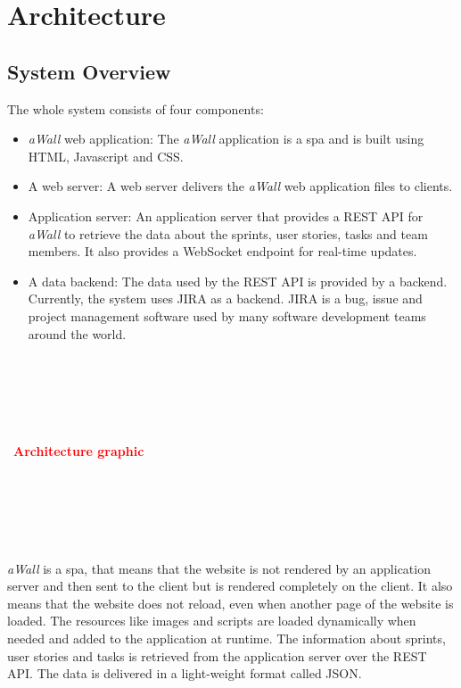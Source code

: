 \documentclass{sigchi}
\newcommand\todo[1]{\\~\\~\\~\\~\\~\textbf{\huge{\textcolor{red}{#1}}}\\~\\~\\~\\~\\~}
\begin{document}
\section{Architecture}

\subsection{System Overview}

The whole system consists of four components:
\begin{itemize}
	\item \textit{aWall} web application: The \textit{aWall} application is a \gls{spa} and is built using HTML, Javascript and CSS.
	\item A web server: A web server delivers the \textit{aWall} web application files to clients.
	\item Application server: An application server that provides a REST API for \textit{aWall} to retrieve the data about the sprints, user stories, tasks and team members.
	It also provides a WebSocket endpoint for real-time updates.
	\item A data backend: The data used by the REST API is provided by a backend. 
	Currently, the system uses JIRA \cite{jira} as a backend. JIRA is a bug, issue and project management software used by many software development teams around the world.
\end{itemize}

\todo{Architecture graphic}

\textit{aWall} is a \gls{spa}, that means that the website is not rendered by an application server and then sent to the client but is rendered completely on the client.
It also means that the website does not reload, even when another page of the website is loaded. 
The resources like images and scripts are loaded dynamically when needed and added to the application at runtime.
The information about sprints, user stories and tasks is retrieved from the application server over the REST API.
The data is delivered in a light-weight format called JSON. 
\end{document}
